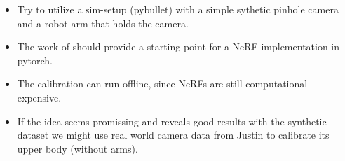\documentclass[a4paper]{article}
\begin{document}
\begin{itemize}
  \item Try to utilize a sim-setup (pybullet) with a simple sythetic pinhole camera and a robot arm that holds the camera.
  \item The work of \cite{SCNeRF2021} should provide a starting point for a NeRF implementation in pytorch.
  \item The calibration can run offline, since NeRFs are still computational expensive.
  \item If the idea seems promissing and reveals good results with the synthetic dataset we might use real world camera data from Justin to calibrate its upper body (without arms).
\end{itemize}
  
  





\end{document}

